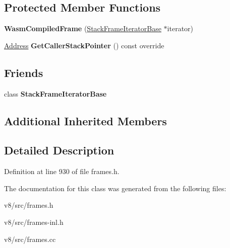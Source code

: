 \subsection*{Protected Member Functions}
\begin{DoxyCompactItemize}
\item 
\mbox{\label{classv8_1_1internal_1_1WasmCompiledFrame_a917b580baaee75af4b2647591ba3b11d}} 
{\bfseries Wasm\+Compiled\+Frame} (\mbox{\hyperlink{classv8_1_1internal_1_1StackFrameIteratorBase}{Stack\+Frame\+Iterator\+Base}} $\ast$iterator)
\item 
\mbox{\label{classv8_1_1internal_1_1WasmCompiledFrame_a3bd8d4c72463f6f207d0ad6c037245a4}} 
\mbox{\hyperlink{classuintptr__t}{Address}} {\bfseries Get\+Caller\+Stack\+Pointer} () const override
\end{DoxyCompactItemize}
\subsection*{Friends}
\begin{DoxyCompactItemize}
\item 
\mbox{\label{classv8_1_1internal_1_1WasmCompiledFrame_ac7310421866976ca454bbe11c5f926c3}} 
class {\bfseries Stack\+Frame\+Iterator\+Base}
\end{DoxyCompactItemize}
\subsection*{Additional Inherited Members}


\subsection{Detailed Description}


Definition at line 930 of file frames.\+h.



The documentation for this class was generated from the following files\+:\begin{DoxyCompactItemize}
\item 
v8/src/frames.\+h\item 
v8/src/frames-\/inl.\+h\item 
v8/src/frames.\+cc\end{DoxyCompactItemize}
